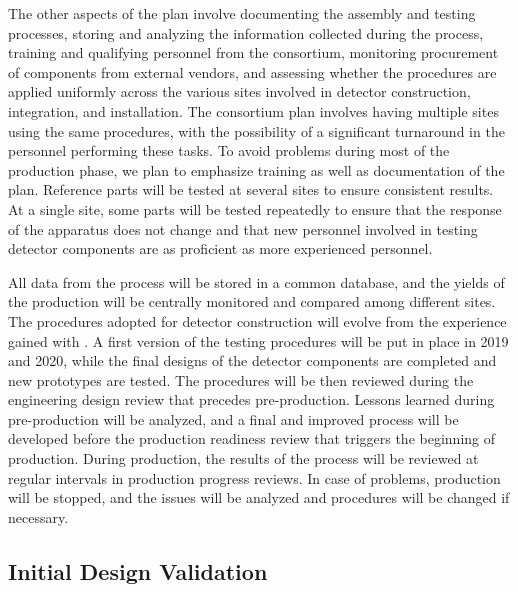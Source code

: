 The other aspects of the  plan involve documenting the 
assembly and testing processes, storing and analyzing the information
collected during the  process, training and qualifying 
personnel from the consortium, monitoring procurement of 
components from external vendors, and assessing whether the
 procedures are applied uniformly across
the various sites involved in detector construction, integration,
and installation. The  consortium plan involves
having multiple sites using the same  procedures,
with the possibility of a significant turnaround in the personnel
performing these tasks. To avoid problems during most of the
production phase, we plan to emphasize training as well as documentation
of the  plan. Reference parts will be tested at
several sites to ensure consistent results. At
a single site, some parts will be tested repeatedly to ensure
that the response of the apparatus does not change and
that new personnel involved in testing detector components are 
as proficient as more experienced personnel. 

All data from
the  process will be stored in a common database, and
the yields of the production will be centrally monitored and 
compared among different sites. The procedures adopted
for detector construction will evolve from the experience
gained with . A first version of the testing procedures
will be put in place in 2019 and 2020, while the final designs of
the detector components are completed and new prototypes are
tested. The  procedures will be then reviewed
during the engineering design review that precedes pre-production. Lessons learned during pre-production
will be analyzed, and a final and improved  process will be 
developed before the production readiness review that triggers
the beginning of production. During production, the results
of the  process will be reviewed at regular intervals
in production progress reviews. In case of problems, production
will be stopped, and the issues will be analyzed 
and procedures will be changed if necessary.

\subsection{Initial Design Validation}
\label{sec:fdsp-tpcelec-qa-initial}

